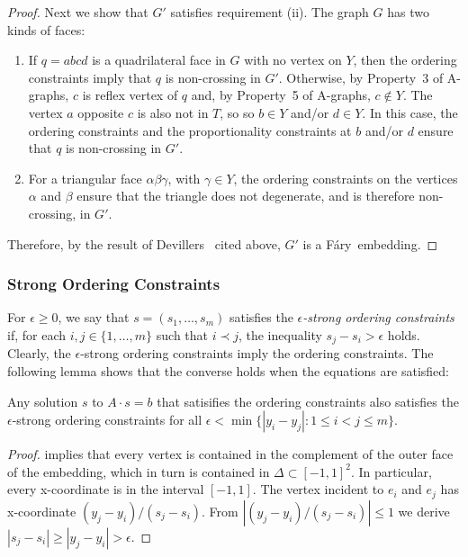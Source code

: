\documentclass{patmorin}
\newcommand{\Fary}{Fáry}
\begin{document}
\begin{proof}
Next we show that $G'$ satisfies requirement (ii). The graph $G$ has two
kinds of faces:
\begin{enumerate}
\item
   If $q=abcd$ is a quadrilateral face in $G$ with no vertex on $Y$,
   then the ordering constraints imply that $q$ is non-crossing in $G'$.
   Otherwise, by Property~3 of A-graphs, $c$ is reflex vertex of $q$ and,
   by Property~5 of A-graphs, $c\not\in Y$.  The vertex $a$ opposite $c$
   is also not in $T$, so so $b\in Y$ and/or $d\in Y$.  In this case,
   the ordering constraints and the proportionality constraints at $b$
   and/or $d$ ensure that $q$ is non-crossing in $G'$.

\item
   For a triangular face $\alpha\beta\gamma$, with $\gamma\in Y$, 
 the ordering constraints on the vertices $\alpha$ and $\beta$
   ensure that the triangle does not degenerate, and is therefore non-crossing, in $G'$.
\end{enumerate}

   Therefore, by the result
of Devillers \etal\
   cited above, $G'$ is a \Fary\ embedding. %
\end{proof}


\subsubsection{Strong Ordering Constraints}
\label{strong}

For $\epsilon \ge 0$, we say that $s=(s_1,\ldots,s_m)$ satisfies
the \emph{$\epsilon$-strong ordering constraints} if, for each
$i,j\in\{1,\ldots,m\}$ such that $i\prec j$, the inequality
$s_j-s_i > \epsilon$ holds.
Clearly, the $\epsilon$-strong
ordering constraints imply the ordering constraints. The following lemma shows
that the converse holds when the equations are satisfied:

\begin{lem}
   Any solution $s$ to $A\cdot s=b$ that satisifies
the ordering constraints
 also satisfies 
   the $\epsilon$-strong ordering constraints
   for all $\epsilon<\min\{|y_i-y_j| : 1\le i< j\le m\}$.
\end{lem}

\begin{proof}
    implies that every vertex is
contained in the complement of the outer face of the
   embedding, which in turn is contained in $\Delta\subset[-1,1]^2$.
In particular, every x-coordinate is
in the interval $[-1,1]$.
The vertex incident to $e_i$ and $e_j$ has x-coordinate
   $(y_j-y_i)/(s_j-s_i)$.
From $|(y_j-y_i)/(s_j-s_i)|\le 1$ we derive
   $|s_j-s_i|\ge|y_j-y_i| > \epsilon$.
\end{proof}
\end{document}

